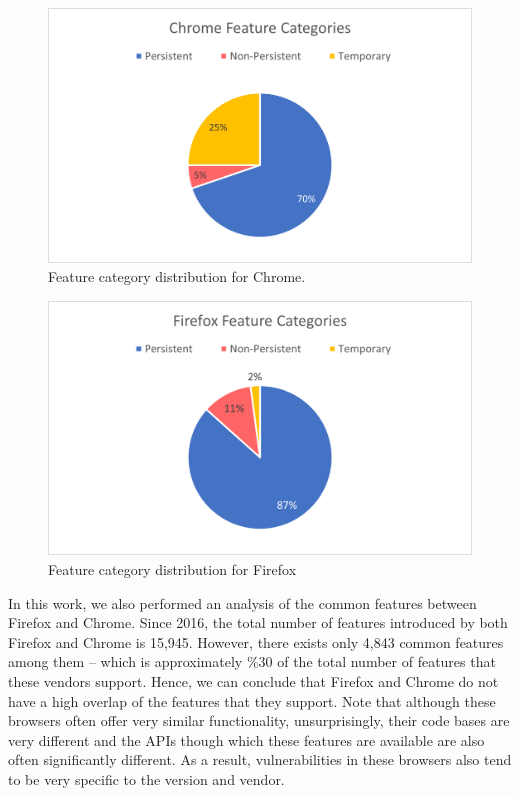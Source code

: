 \begin{figure}[ht]
    \centering
    \includegraphics[width=\columnwidth]{figures/chrome-feature-categories.png}
    \caption{Feature category distribution for Chrome.}
    \label{fig:chrome-categories}
\end{figure}

\begin{figure}[ht]
    \centering
    \includegraphics[width=\columnwidth]{figures/firefox-feature-categories.png}
    \caption{Feature category distribution for Firefox}
    \label{fig:times_bar}
  \end{figure}

  In this work, we also performed an analysis of the common features
  between Firefox and Chrome. Since 2016, the total number of features
  introduced by both Firefox and Chrome is 15,945. However, there
  exists only 4,843 common features among them -- which is
  approximately \%30 of the total number of features that these
  vendors support. Hence, we can conclude that Firefox and Chrome do
  not have a high overlap of the features that they support. Note that
  although these browsers often offer very similar functionality,
  unsurprisingly, their code bases are very different and the APIs
  though which these features are available are also often
  significantly different. As a result, vulnerabilities in these
  browsers also tend to be very specific to the version and vendor.

